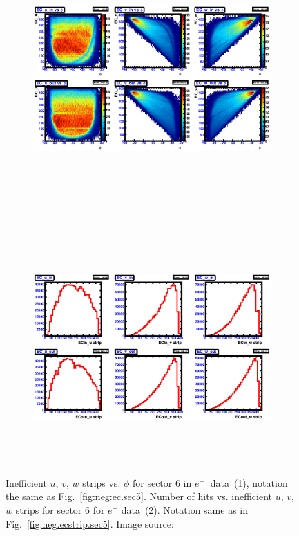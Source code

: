 \begin{figure}[!ht]
  \centering
  \begin{subfigure}[b]{\figwidth}
  \includegraphics[width=\figwidth, height=3.5in,valign=c]{figures/calib/ec/pim_ecuvw_phi_NOKnockout_sec6.eps}\caption{}\label{fig:EC_I_VI}
  \end{subfigure}%
  \\
  \begin{subfigure}[b]{\figwidth}
  \includegraphics[width=\figwidth, height=3.5in,valign=c]{figures/calib/ec/pim_ecuvw_NOKnockout_sec6.eps}\caption{}\label{fig:EC_II_VI}
  \end{subfigure}%
      \caption {Inefficient  $u$, $v$, $w$ strips vs. $\phi$ for sector 6 in  $e^{-} \ $ data~(\ref{fig:EC_I_VI}), notation the same as Fig.~\ref{fig:neg:ec.sec5}. Number of hits vs. inefficient  $u$, $v$, $w$ strips for sector 6 for $e^-$ data~(\ref{fig:EC_II_VI}). Notation same as in Fig.~\ref{fig:neg.ecstrip.sec5}. Image source:~\cite{clas.thesis.kunkel}}
        \label{fig:EC_no_VI}
\end{figure}



